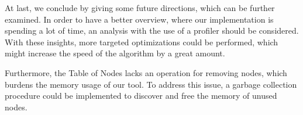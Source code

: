 At last, we conclude by giving some future directions, which can be further examined.
In order to have a better overview, where our implementation is spending a lot of time, an analysis with the use of a profiler should be considered. With these insights, more targeted optimizations could be performed, which might increase the speed of the algorithm by a great amount. 

Furthermore, the Table of Nodes lacks an operation for removing nodes, which burdens the memory usage of our tool. To address this issue, a garbage collection procedure could be implemented to discover and free the memory of unused nodes.



